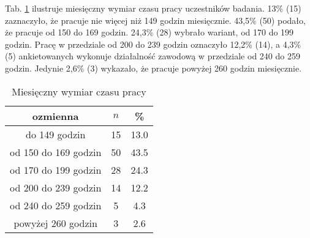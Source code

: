 Tab. \ref{tab:Q3} ilustruje miesięczny wymiar czasu pracy uczestników badania. 13\% (15) zaznaczyło, że pracuje nie więcej niż 149 godzin miesięcznie. 43,5\%  (50) podało, że pracuje od 150 do 169 godzin. 24,3\% (28) wybrało wariant, od 170 do 199 godzin. Pracę w przedziale od 200 do 239 godzin oznaczyło 12,2\% (14), a 4,3\% (5) ankietowanych wykonuje działalność zawodową w przedziale od 240 do 259 godzin. Jedynie 2,6\% (3) wykazało, że pracuje powyżej 260 godzin miesięcznie.


 
\begin{table}[H]
\caption{Miesięczny wymiar czasu pracy}
\centering
\begin{tabular}{ | c | c | c |}
\hline
ozmienna & $n$ & \% \\
\hline
do 149 godzin  &  15  & 13.0\\
\hline
od 150 do 169 godzin  &  50  & 43.5 \\
\hline
od 170 do 199 godzin  &  28  & 24.3 \\
\hline
od 200 do 239 godzin  &  14  & 12.2 \\
\hline
od 240 do 259 godzin  &  5  & 4.3 \\
\hline
powyżej 260 godzin  &  3  & 2.6 \\
\hline
\end{tabular}
\label{tab:Q3}
\end{table}

